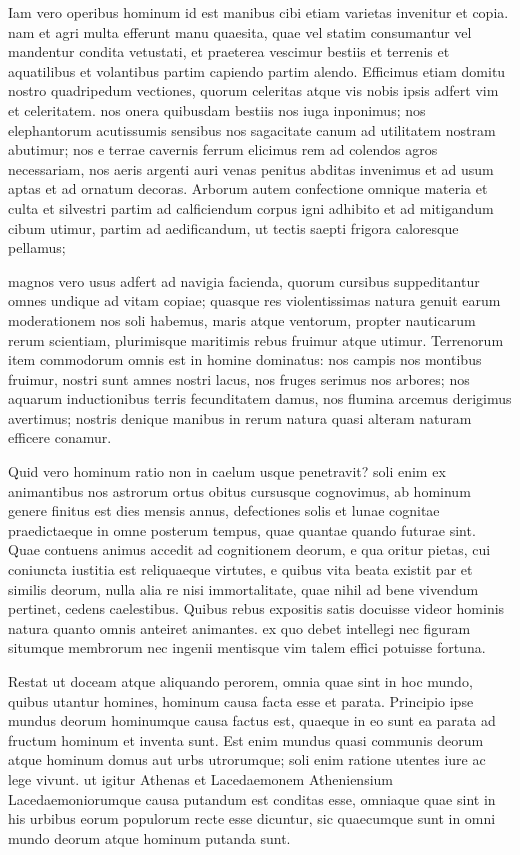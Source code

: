  Iam vero operibus hominum id est manibus cibi etiam varietas invenitur et copia. nam et agri multa efferunt manu quaesita, quae vel statim consumantur vel mandentur condita vetustati, et praeterea vescimur bestiis et terrenis et aquatilibus et volantibus partim capiendo partim alendo. Efficimus etiam domitu nostro quadripedum vectiones, quorum celeritas atque vis nobis ipsis adfert vim et celeritatem. nos onera quibusdam bestiis nos iuga inponimus; nos elephantorum acutissumis sensibus nos sagacitate canum ad utilitatem nostram abutimur; nos e terrae cavernis ferrum elicimus rem ad colendos agros necessariam, nos aeris argenti auri venas penitus abditas invenimus et ad usum aptas et ad ornatum decoras. Arborum autem confectione omnique materia et culta et silvestri partim ad calficiendum corpus igni adhibito et ad mitigandum cibum utimur, partim ad aedificandum, ut tectis saepti frigora caloresque pellamus;

 magnos vero usus adfert ad navigia facienda, quorum cursibus suppeditantur omnes undique ad vitam copiae; quasque res violentissimas natura genuit earum moderationem nos soli habemus, maris atque ventorum, propter nauticarum rerum scientiam, plurimisque maritimis rebus fruimur atque utimur. Terrenorum item commodorum omnis est in homine dominatus: nos campis nos montibus fruimur, nostri sunt amnes nostri lacus, nos fruges serimus nos arbores; nos aquarum inductionibus terris fecunditatem damus, nos flumina arcemus derigimus avertimus; nostris denique manibus in rerum natura quasi alteram naturam efficere conamur.

 Quid vero hominum ratio non in caelum usque penetravit? soli enim ex animantibus nos astrorum ortus obitus cursusque cognovimus, ab hominum genere finitus est dies mensis annus, defectiones solis et lunae cognitae praedictaeque in omne posterum tempus, quae quantae quando futurae sint. Quae contuens animus accedit ad cognitionem deorum, e qua oritur pietas, cui coniuncta iustitia est reliquaeque virtutes, e quibus vita beata existit par et similis deorum, nulla alia re nisi immortalitate, quae nihil ad bene vivendum pertinet, cedens caelestibus. Quibus rebus expositis satis docuisse videor hominis natura quanto omnis anteiret animantes. ex quo debet intellegi nec figuram situmque membrorum nec ingenii mentisque vim talem effici potuisse fortuna.

 Restat ut doceam atque aliquando perorem, omnia quae sint in hoc mundo, quibus utantur homines, hominum causa facta esse et parata. Principio ipse mundus deorum hominumque causa factus est, quaeque in eo sunt ea parata ad fructum hominum et inventa sunt. Est enim mundus quasi communis deorum atque hominum domus aut urbs utrorumque; soli enim ratione utentes iure ac lege vivunt. ut igitur Athenas et Lacedaemonem Atheniensium Lacedaemoniorumque causa putandum est conditas esse, omniaque quae sint in his urbibus eorum populorum recte esse dicuntur, sic quaecumque sunt in omni mundo deorum atque hominum putanda sunt.

